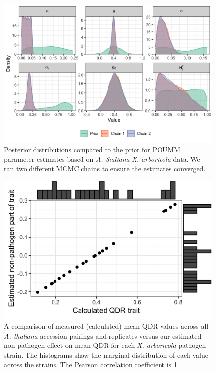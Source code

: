 \documentclass[11pt]{article}
\begin{document}
\begin{doublespace}
\begin{figure}[H]
	\centering
		\includegraphics[width=0.7\linewidth]{figures/poumm_parameter_estimates_arboricola.png}
		\caption{Posterior distributions compared to the prior for POUMM parameter estimates based on \emph{A. thaliana}-\emph{X. arboricola} data. We ran two different MCMC chains to ensure the estimates converged.}
\label{fig:poumm-parameters-qdr}
\end{figure}

\begin{figure}[H]
\begin{center}
\includegraphics[width = 0.462\linewidth]{figures/trait_values_arboricola.png}
	\caption{A comparison of measured (calculated) mean QDR values across all \emph{A. thaliana} accession pairings and replicates  versus our estimated non-pathogen effect on mean QDR for each \emph{X. arboricola} pathogen strain. The histograms show the marginal distribution of each value across the strains. The Pearson correlation coefficient is 1.}
	\label{fig:trait-comparison-qdr}
	\end{center}
\end{figure}


\end{doublespace}
\end{document}
